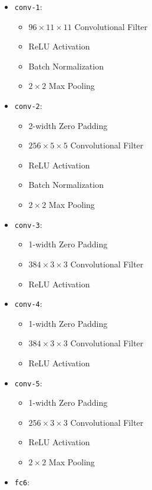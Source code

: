 \begin{figure}
	\begin{mdframed}
		\begin{itemize}
			\item \texttt{conv-1}:
			\begin{itemize}
				\item $96 \times 11 \times 11$ Convolutional Filter
				\item ReLU Activation
				\item Batch Normalization
				\item $2 \times 2$ Max Pooling
			\end{itemize}
			\item \texttt{conv-2}:
			\begin{itemize}
				\item 2-width Zero Padding
				\item $256 \times 5 \times 5$ Convolutional Filter
				\item ReLU Activation
				\item Batch Normalization
				\item $2 \times 2$ Max Pooling
			\end{itemize}
			\item \texttt{conv-3}:
			\begin{itemize}
				\item 1-width Zero Padding
				\item $384 \times 3 \times 3$ Convolutional Filter
				\item ReLU Activation
			\end{itemize}
			\item \texttt{conv-4}:
			\begin{itemize}
				\item 1-width Zero Padding
				\item $384 \times 3 \times 3$ Convolutional Filter
				\item ReLU Activation
			\end{itemize}
			\item \texttt{conv-5}:
			\begin{itemize}
				\item 1-width Zero Padding
				\item $256 \times 3 \times 3$ Convolutional Filter
				\item ReLU Activation
				\item $2 \times 2$ Max Pooling
			\end{itemize}
			\item \texttt{fc6}:
			\begin{itemize}

\end{itemize}
\end{itemize}
\end{mdframed}
\end{figure}
